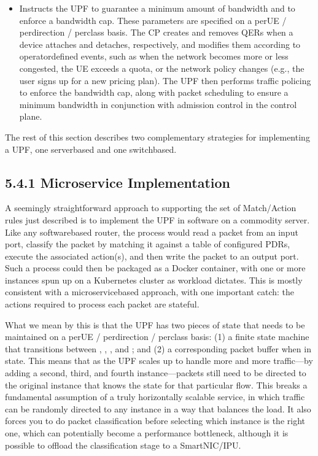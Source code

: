 \documentclass[a4paper,11pt,english]{sphinxmanual}
\begin{document}
\begin{itemize}
\item {} 
\sphinxAtStartPar
{} Instructs the UPF to guarantee
a minimum amount of bandwidth and to enforce a bandwidth cap. These
parameters are specified on a per\sphinxhyphen{}UE / per\sphinxhyphen{}direction / per\sphinxhyphen{}class
basis.  The CP creates and removes QERs when a device attaches and
detaches, respectively, and modifies them according to
operator\sphinxhyphen{}defined events, such as when the network becomes more or
less congested, the UE exceeds a quota, or the network policy
changes (e.g., the user signs up for a new pricing plan).  The UPF
then performs traffic policing to enforce the bandwidth cap, along
with packet scheduling to ensure a minimum bandwidth in conjunction
with admission control in the control plane.

\end{itemize}

\sphinxAtStartPar
The rest of this section describes two complementary strategies for
implementing a UPF, one server\sphinxhyphen{}based and one switch\sphinxhyphen{}based.


\subsection{5.4.1 Microservice Implementation}
\label{\detokenize{core:microservice-implementation}}
\sphinxAtStartPar
A seemingly straightforward approach to supporting the set of
Match/Action rules just described is to implement the UPF in software
on a commodity server. Like any software\sphinxhyphen{}based router, the process
would read a packet from an input port, classify the packet by
matching it against a table of configured PDRs, execute the associated
action(s), and then write the packet to an output port. Such a process
could then be packaged as a Docker container, with one or more
instances spun up on a Kubernetes cluster as workload dictates. This
is mostly consistent with a microservice\sphinxhyphen{}based approach, with one
important catch: the actions required to process each packet are
stateful.

\sphinxAtStartPar
What we mean by this is that the UPF has two pieces of state that
needs to be maintained on a per\sphinxhyphen{}UE / per\sphinxhyphen{}direction / per\sphinxhyphen{}class basis:
(1) a finite state machine that transitions between ,
, , and ; and (2) a corresponding packet
buffer when in  state. This means that as the UPF scales
up to handle more and more traffic—by adding a second, third, and
fourth instance—packets still need to be directed to the original
instance that knows the state for that particular flow. This breaks a
fundamental assumption of a truly horizontally scalable service, in
which traffic can be randomly directed to any instance in a way that
balances the load. It also forces you to do packet classification
before selecting which instance is the right one, which can
potentially become a performance bottleneck, although it is possible
to offload the classification stage to a SmartNIC/IPU.
\end{document}
